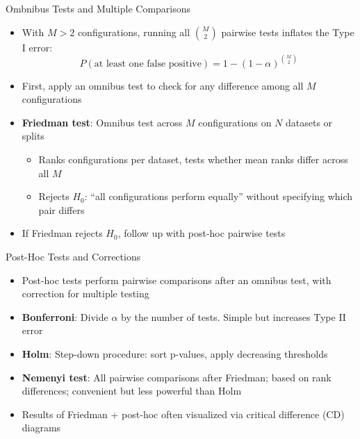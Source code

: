 \documentclass[main]{subfiles}
\begin{document}
\begin{frame}{Ombnibus Tests and Multiple Comparisons}
    \begin{itemize}
        \item With $M>2$ configurations, running all $\binom{M}{2}$ pairwise tests inflates the Type I error:
        $$P(\text{at least one false positive}) = 1 - (1-\alpha)^{\binom{M}{2}}$$
        \item First, apply an \alert{omnibus test} to check for \alert{any} difference among all $M$ configurations
        \item \textbf{Friedman test}: Omnibus test across $M$ configurations on $N$ datasets or splits
        \begin{itemize}
            \item Ranks configurations per dataset, tests whether mean ranks differ across all $M$
            \item Rejects $H_0$: ``all configurations perform equally'' without specifying which pair differs
        \end{itemize}
        \item If Friedman rejects $H_0$, follow up with \alert{post-hoc} pairwise tests
    \end{itemize}
\end{frame}

\begin{frame}{Post-Hoc Tests and Corrections}
    \begin{itemize}
        \item Post-hoc tests perform pairwise comparisons after an omnibus test, with correction for multiple testing
        \item \textbf{Bonferroni}: Divide $\alpha$ by the number of tests. Simple but increases Type II error
        \item \textbf{Holm}: Step-down procedure: sort p-values, apply decreasing thresholds
        \item \textbf{Nemenyi test}: All pairwise comparisons after Friedman; based on rank differences; convenient but less powerful than Holm
    \end{itemize}
    
    \vspace{.2cm}
    
    \begin{minipage}{.6\textwidth}
    \begin{itemize}
        \item Results of Friedman + post-hoc often visualized via \alert{critical difference} (CD) diagrams
    \end{itemize}
    \end{minipage}
    \hfill
    \begin{minipage}{.3\textwidth}
    \resizebox{\textwidth}{!}{
        }
    \end{minipage}
\end{frame}
\end{document}
